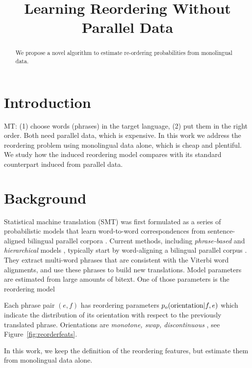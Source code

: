 \documentclass[11pt,letterpaper]{article}
\title{Learning Reordering Without Parallel Data}
\date{}
\newcommand{\mnote}[1]{\marginpar{%
  \vskip-\baselineskip
  \raggedright\footnotesize
  \itshape\hrule\smallskip\tiny{#1}\par\smallskip\hrule}}
\newcommand{\mtodo}[1]{\mnote{\textcolor{red}{#1}}}
\newcommand{\figref}[1]{Figure~\ref{#1}}
\begin{document}
\maketitle

\begin{abstract}
We propose a novel algorithm to estimate re-ordering probabilities from monolingual data.
\end{abstract}

\section{Introduction}

MT: (1) choose words (phrases) in the target language, (2) put them in the right order.  Both need parallel data, which is expensive.  In this work we address the reordering problem using monolingual data alone, which is cheap and plentiful. We study how the induced reordering model compares with its standard counterpart induced from parallel data.

\section{Background} \label{sect:bckg}

\mtodo{Brief background on MT, reordering models.}

Statistical machine translation (SMT) was first formulated as a series of probabilistic models that learn word-to-word correspondences from sentence-aligned bilingual parallel corpora \cite{Brown:1993}.  \nocite{Brown1988}
%
Current methods, including {\em phrase-based} \cite{Och:2002,Koehn:2003} and {\em hierarchical} models \cite{Chiang:2005}, typically start by word-aligning a bilingual parallel corpus \cite{Och2003}.  They extract multi-word phrases that are consistent with the Viterbi word alignments, and use these phrases to build new translations.  Model parameters are estimated from large amounts of bitext.  One of those parameters is the reordering model

Each phrase pair $(e, f)$ has reordering parameters $p_o(\textnormal{orientation}|f,e)$ which indicate the distribution of its orientation with respect to the previously translated phrase. Orientations are {\it monotone, swap, discontinuous} \cite{tillman:2004:HLTNAACL,Kumar2004}, see \figref{fig:reorderfeats}. 

In this work, we keep the definition of the reordering features, but estimate them from monolingual data alone. 
\end{document}
